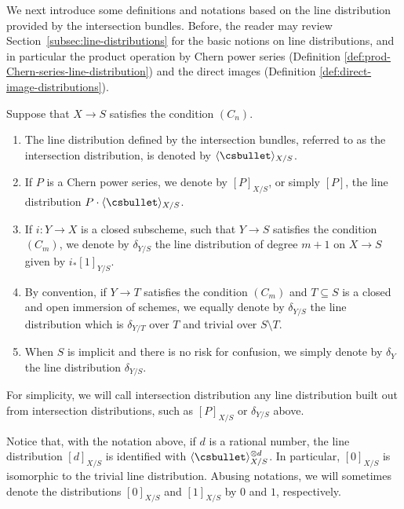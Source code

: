 We next introduce some definitions and notations based on the line distribution provided by the intersection bundles. Before, the reader may review Section~\ref{subsec:line-distributions} for the basic notions on line distributions, and in particular the product operation by Chern power series (\cf Definition \ref{def:prod-Chern-series-line-distribution}) and the direct images (\cf Definition \ref{def:direct-image-distributions}).

\begin{definition}\label{definition:intersectiondistribution}
Suppose that $X\to S$ satisfies the condition $(C_n)$.

\begin{enumerate}
\item The line distribution defined by the intersection bundles, referred to as the intersection distribution, is denoted by $\langle \csbullet \rangle_{X/S}$.
\item If $P$ is a Chern power series, we denote by $[ P ]_{X/S}$, or simply $[P]$, the line distribution $P \cdot \langle \csbullet \rangle_{X/S}$.
\item If $i\colon Y \to X$ is a closed subscheme, such that $Y \to S$ satisfies the condition $(C_m)$, we denote by $\delta_{Y/S}$ the line distribution of degree $m+1$ on $X \to S$ given by $i_\ast[ 1 ]_{Y/S} $.
\item By convention, if $Y \to T$ satisfies the condition $(C_m)$ and $T \subseteq S$ is a closed and open immersion of schemes, we equally denote by $\delta_{Y/S}$ the line distribution which is $\delta_{Y/T}$ over $T$ and trivial over $S\setminus T$.
\item When $S$ is implicit and there is no risk for confusion, we simply denote by $\delta_{Y}$ the line distribution $\delta_{Y/S}$.
\end{enumerate}
\end{definition}

For simplicity, we will call intersection distribution any line distribution built out from intersection distributions, such as $[P]_{X/S}$ or $\delta_{Y/S}$ above.

Notice that, with the notation above, if $d$ is a rational number, the line distribution $[d]_{X/S}$ is identified with $\langle\csbullet\rangle_{X/S}^{\otimes d}$. In particular, $[0]_{X/S}$ is isomorphic to the trivial line distribution. Abusing notations, we will sometimes denote the distributions $[0]_{X/S}$ and $[1]_{X/S}$ by $0$ and $1$, respectively.


